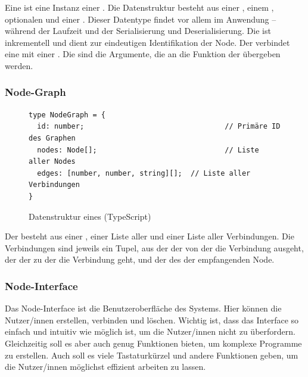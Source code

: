 \documentclass[ngerman]{article}
\begin{document}
Eine  ist eine Instanz einer . Die Datenstruktur besteht aus einer , einem , optionalen  und einer . 
Dieser Datentype findet vor allem im  Anwendung – während der Laufzeit und der Serialisierung und Deserialisierung.
\br
Die  ist inkrementell und dient zur eindeutigen Identifikation der Node. Der  verbindet eine  mit einer .
Die  sind die Argumente, die an die  Funktion der  übergeben werden.

\subsubsection*{Node-Graph}

\begin{figure}[htbp]
  \begin{code}
    \begin{verbatim}
type NodeGraph = {
  id: number;                                 // Primäre ID des Graphen
  nodes: Node[];                              // Liste aller Nodes
  edges: [number, number, string][];  // Liste aller Verbindungen
}
    \end{verbatim}
  \end{code}

  \caption{Datenstruktur eines  (TypeScript)}
  \label{fig:data_node_graph}

\end{figure}

Der  besteht aus einer , einer Liste aller  und einer Liste aller Verbindungen. 
Die Verbindungen sind jeweils ein Tupel, aus der  der  von der die Verbindung ausgeht, der  der  zu der die Verbindung geht, und der  des  der empfangenden Node.

\pagebreak

\subsubsection{Node-Interface}
\label{sec:node_interface}

Das Node-Interface ist die Benutzeroberfläche des Systems. Hier können die Nutzer/innen  erstellen, verbinden und löschen. 
Wichtig ist, dass das Interface so einfach und intuitiv wie möglich ist, um die Nutzer/innen nicht zu überfordern. Gleichzeitig soll es aber auch genug Funktionen bieten, um komplexe Programme zu erstellen. Auch soll es viele Tastaturkürzel und andere Funktionen geben, um die Nutzer/innen möglichst effizient arbeiten zu lassen.
\end{document}
